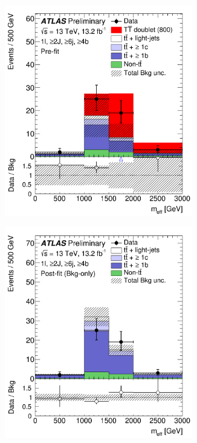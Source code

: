 \begin{figure}[p!]
\begin{subfigure}{0.24\textwidth}
  \caption{}
  \label{}
\end{subfigure}
\begin{subfigure}{0.24\textwidth}
  \centering
  \includegraphics[width=0.9\textwidth]{figures/VLQ/fig_11c.png}
  \caption{}
  \label{}
\end{subfigure}
\begin{subfigure}{0.24\textwidth}
  \centering
  \includegraphics[width=0.9\textwidth]{figures/VLQ/fig_11d.png}

\end{subfigure}
\end{figure}
